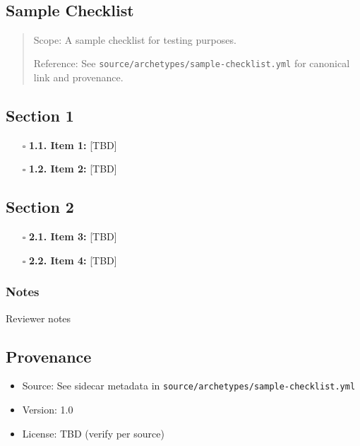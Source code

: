 \documentclass[11pt]{article}
\def\tightlist{}
\begin{document}
\begin{center}
{\LARGE }\\[4pt]
\normalsize 
\end{center}
\vspace{1em}

\begin{Form}

\section{Sample Checklist}\label{sample-checklist}

\begin{quote}
Scope: A sample checklist for testing purposes.

Reference: See \texttt{source/archetypes/sample-checklist.yml} for
canonical link and provenance.
\end{quote}

\subsection{Section 1}\label{section-1}

\begin{itemize}
\tightlist
\item[$\square$]
  \textbf{1.1. Item 1:} {[}TBD{]}
\item[$\square$]
  \textbf{1.2. Item 2:} {[}TBD{]}
\end{itemize}

\subsection{Section 2}\label{section-2}

\begin{itemize}
\tightlist
\item[$\square$]
  \textbf{2.1. Item 3:} {[}TBD{]}
\item[$\square$]
  \textbf{2.2. Item 4:} {[}TBD{]}
\end{itemize}

\subsubsection{Notes}\label{notes}

{Reviewer notes}

\subsection{Provenance}\label{provenance}

\begin{itemize}
\tightlist
\item
  Source: See sidecar metadata in
  \texttt{source/archetypes/sample-checklist.yml}
\item
  Version: 1.0
\item
  License: TBD (verify per source)
\end{itemize}

\end{Form}
\end{document}
